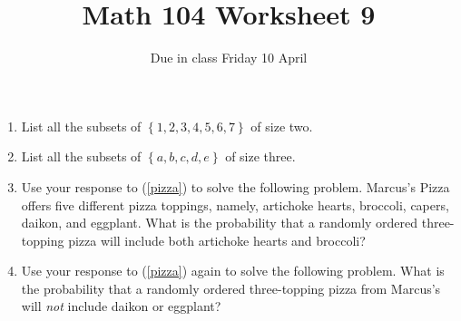 \documentclass[12pt]{article}
\author{}\date{Due in class Friday 10 April}
\title{Math 104 Worksheet 9}\author{}
\begin{document}
\maketitle
\thispagestyle{empty}
\begin{enumerate}
\item List all the subsets of $\left\{1,2,3,4,5,6,7\right\}$
of size two.
\vspace{2in}
\item\label{pizza}
List all the subsets of $\left\{a,b,c,d,e\right\}$
of size three.
\vspace{1in}
\item Use your response to (\ref{pizza}) to solve the following problem.
Marcus's Pizza offers five different pizza toppings,
namely, artichoke hearts, broccoli, capers, daikon, and eggplant.
What is the probability that a randomly ordered three-topping pizza
will include both artichoke hearts and broccoli?
\vspace{1in}
\item Use your response to (\ref{pizza}) again to solve the following problem.
What is the probability that a randomly ordered three-topping pizza from Marcus's
will {\em not} include daikon or eggplant?
\end{enumerate}
\end{document}
